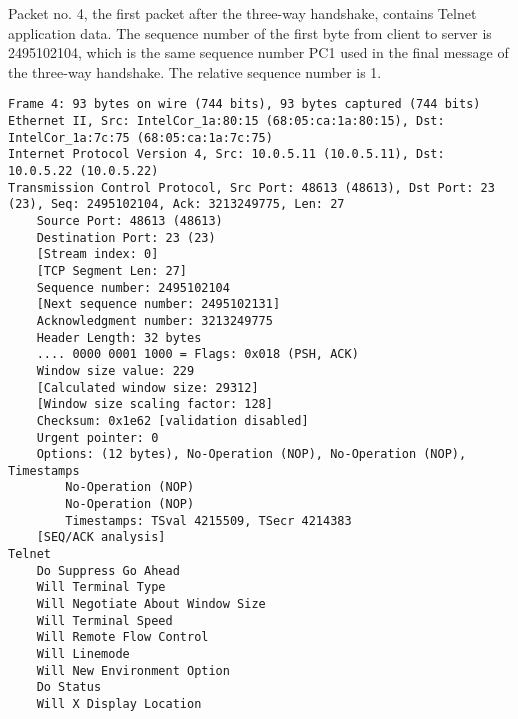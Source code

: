 Packet no. 4, the first packet after the three-way handshake, contains Telnet application data. The sequence number of the first byte from client to server is 2495102104, which is the same sequence number PC1 used in the final message of the three-way handshake. The relative sequence number is 1.

\begin{lstlisting}
Frame 4: 93 bytes on wire (744 bits), 93 bytes captured (744 bits)
Ethernet II, Src: IntelCor_1a:80:15 (68:05:ca:1a:80:15), Dst: IntelCor_1a:7c:75 (68:05:ca:1a:7c:75)
Internet Protocol Version 4, Src: 10.0.5.11 (10.0.5.11), Dst: 10.0.5.22 (10.0.5.22)
Transmission Control Protocol, Src Port: 48613 (48613), Dst Port: 23 (23), Seq: 2495102104, Ack: 3213249775, Len: 27
    Source Port: 48613 (48613)
    Destination Port: 23 (23)
    [Stream index: 0]
    [TCP Segment Len: 27]
    Sequence number: 2495102104
    [Next sequence number: 2495102131]
    Acknowledgment number: 3213249775
    Header Length: 32 bytes
    .... 0000 0001 1000 = Flags: 0x018 (PSH, ACK)
    Window size value: 229
    [Calculated window size: 29312]
    [Window size scaling factor: 128]
    Checksum: 0x1e62 [validation disabled]
    Urgent pointer: 0
    Options: (12 bytes), No-Operation (NOP), No-Operation (NOP), Timestamps
        No-Operation (NOP)
        No-Operation (NOP)
        Timestamps: TSval 4215509, TSecr 4214383
    [SEQ/ACK analysis]
Telnet
    Do Suppress Go Ahead
    Will Terminal Type
    Will Negotiate About Window Size
    Will Terminal Speed
    Will Remote Flow Control
    Will Linemode
    Will New Environment Option
    Do Status
    Will X Display Location
\end{lstlisting}


